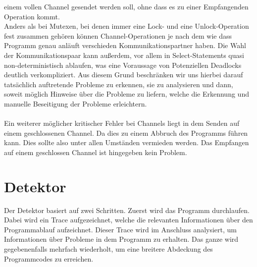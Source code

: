 einem vollen Channel gesendet werden soll, ohne dass es zu einer Empfangenden
Operation kommt.\\
Anders als bei Mutexen, bei denen immer eine Lock-
und eine Unlock-Operation fest zusammen gehören können Channel-Operationen
je nach dem wie dass Programm genau anläuft verschieden Kommunikationspartner 
haben. Die Wahl der Kommunikationspaar kann außerdem, vor allem in Select-Statements
quasi non-deterministisch ablaufen, was eine Voraussage von Potenziellen 
Deadlocks deutlich verkompliziert. Aus diesem Grund beschränken wir uns 
hierbei darauf tatsächlich auftretende Probleme zu erkennen, sie zu analysieren 
und dann, soweit möglich Hinweise über die Probleme zu liefern, welche die 
Erkennung und manuelle Beseitigung der Probleme erleichtern.\\\\
Ein weiterer möglicher kritischer Fehler bei Channels liegt in dem 
Senden auf einem geschlossenen Channel. Da dies zu einem Abbruch des 
Programms führen kann. Dies sollte also unter allen Umständen vermieden werden.
Das Empfangen auf einem geschlossen Channel ist hingegeben kein Problem. 

\section{Detektor}
Der Detektor basiert auf zwei Schritten. Zuerst wird das Programm 
durchlaufen. Dabei wird ein Trace aufgezeichnet, welche die relevanten 
Informationen über den Programmablauf aufzeichnet. Dieser 
Trace wird im Anschluss analysiert, um Informationen über Probleme 
in dem Programm zu erhalten. Das ganze wird gegebenenfalls mehrfach wiederholt,
um eine breitere Abdeckung des Programmcodes zu erreichen.


